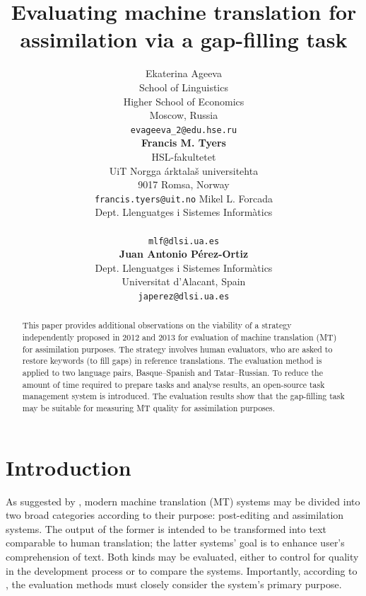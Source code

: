 \documentclass[11pt]{article}
\title{Evaluating machine translation for assimilation via a gap-filling task}
\author{{Ekaterina Ageeva}\\
  {School of Linguistics}\\
  {Higher School of Economics}\\
  {Moscow, Russia}\\
  {{\tt evageeva\_2@edu.hse.ru}}\\[2ex]
  {\textbf{Francis M. Tyers}}\\
  {HSL-fakultetet}\\ 
  {UiT Norgga \'{a}rktala\v{s} universitehta} \\
  {9017 Romsa, Norway} \\
  {{\tt francis.tyers@uit.no}}
  \And
  {Mikel L. Forcada}\\
  {Dept. Llenguatges i Sistemes Inform\`{a}tics}\\
  \blankout{Universitat d'Alacant, Spain} \\
  {{\tt mlf@dlsi.ua.es}}  \\[2ex]
  {\textbf{Juan Antonio P\'{e}rez-Ortiz}} \\
  {Dept. Llenguatges i Sistemes Inform\`{a}tics}\\
  {Universitat d'Alacant, Spain} \\
  {{\tt japerez@dlsi.ua.es}}
}
\date{}
\begin{document}
\maketitle
\renewcommand{\baselinestretch}{0.97} %
\begin{abstract}
  This paper provides additional observations on the viability of a
  strategy independently proposed in 2012 and 2013 for evaluation of
 machine translation (MT) for assimilation purposes. The strategy involves
  human evaluators, who are asked to restore keywords (to fill gaps) in
  reference translations. The evaluation method is applied to two language pairs, Basque--Spanish and Tatar--Russian. To reduce the amount of time required to prepare tasks
  and analyse results, an open-source task management system is
  introduced. The evaluation results show that the gap-filling task may be suitable for measuring MT
  quality for assimilation purposes.
\end{abstract}

\section{Introduction}

As suggested by \citet{church93}, modern machine translation (MT) systems may
be divided into two broad categories according to their purpose: post-editing and assimilation systems. The output of the former is intended to be transformed into text comparable to human translation; the latter systems' goal is to enhance user's comprehension of text. Both kinds may be evaluated, either to control for quality in the development process or to compare the systems. Importantly, according to \citet{church93}, the evaluation methods must closely consider the system's primary purpose.
\end{document}
